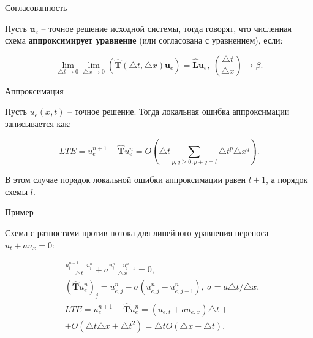 \documentclass[10pt,xcolor=pst,aspectratio=169]{beamer}
\begin{document}
\begin{frame}{Согласованность}

	\transdissolve[duration=0.1]
	\justifying
	\large


	Пусть $\textbf{u}_{e}$ -- точное решение исходной системы, тогда говорят, что численная схема \textbf{аппроксимирует уравнение} (или согласована с уравнением), если:


	\[
		\lim_{\triangle t \rightarrow 0} \lim_{\triangle x \rightarrow 0} \left( \hat{\textbf{T}} (\triangle t, \triangle x) \textbf{u}_{e} \right) = \hat{\textbf{L}} \textbf{u}_{e}, \: \left( \frac{\triangle t}{\triangle x} \right) \rightarrow \beta.
	\]

\end{frame}

\begin{frame}{Аппроксимация}

	\transdissolve[duration=0.1]
	\justifying
	\large

	Пусть $u_{e} (x, t)$ -- точное решение. Тогда локальная ошибка аппроксимации записывается как:

	\[
		LTE = u^{n + 1}_{e} - \hat{\textbf{T}} u^{n}_{e} = O \left( \triangle t \sum_{p , q \geq 0, p + q = l} \triangle t^{p} \triangle x^{q} \right).
	\]

	В этом случае порядок локальной ошибки аппроксимации равен $l + 1$, а порядок схемы $l$.

\end{frame}

\begin{frame}{Пример}

	\transdissolve[duration=0.1]
	\justifying
	\large

	Схема с разностями против потока для линейного уравнения переноса $u_{t} + a u_{x} = 0$:

	\[
		\begin{split}
			&\frac{u^{n + 1}_{i} - u^{n}_{i}}{\triangle t} + a \frac{u^{n}_{i} - u^{n}_{i - 1}}{\triangle x} = 0, \\
			&\left( \hat{\textbf{T}} u^{n}_{e} \right)_{j} = u^{n}_{e, j} - \sigma \left( u^{n}_{e, j} - u^{n}_{e, j - 1} \right), \: \sigma = a \triangle t / \triangle x, \\
			&LTE = u^{n + 1}_{e} - \hat{\textbf{T}} u^{n}_{e} = \left( u_{e, t} + a u_{e, x} \right) \triangle t +\\
			& + O \left( \triangle t \triangle x + \triangle t^{2} \right) = \triangle t O \left( \triangle x + \triangle t \right).
		\end{split}
	\]

\end{frame}
\end{document}
